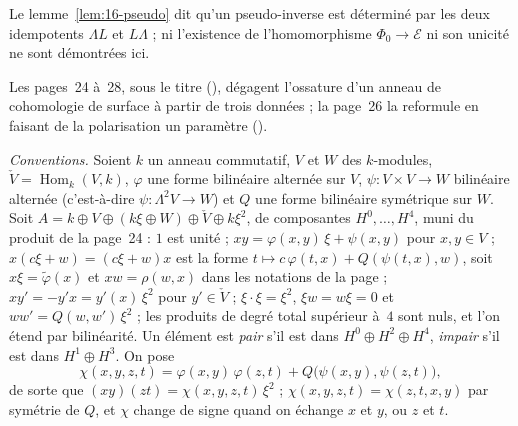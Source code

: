 \noindent Le lemme~\ref{lem:16-pseudo} dit qu'un pseudo-inverse est déterminé par les deux idempotents $\Lambda L$ et $L\Lambda$ ; ni l'existence de l'homomorphisme $\Phi_0 \to \mathcal E$ ni son unicité ne sont démontrées ici.

Les pages~24 à~28, sous le titre  (), dégagent l'ossature d'un anneau de cohomologie de surface à partir de trois données ; la page~26 la reformule en faisant de la polarisation un paramètre ().

\noindent\emph{Conventions.} Soient $k$ un anneau commutatif, $V$ et $W$ des $k$-modules, $\check V = \operatorname{Hom}_k(V, k)$, $\varphi$ une forme bilinéaire alternée sur $V$, $\psi \colon V \times V \to W$ bilinéaire alternée (c'est-à-dire $\psi \colon \Lambda^2 V \to W$) et $Q$ une forme bilinéaire symétrique sur $W$. Soit $A = k \oplus V \oplus (k\xi \oplus W) \oplus \check V \oplus k\xi^2$, de composantes $H^0, \dots, H^4$, muni du produit de la page~24 : $1$ est unité ; $xy = \varphi(x,y)\,\xi + \psi(x,y)$ pour $x, y \in V$ ; $x(c\xi + w) = (c\xi + w)x$ est la forme $t \mapsto c\,\varphi(t,x) + Q(\psi(t,x), w)$, soit $x\xi = \tilde\varphi(x)$ et $xw = \rho(w,x)$ dans les notations de la page ; $xy' = -y'x = y'(x)\,\xi^2$ pour $y' \in \check V$ ; $\xi\cdot\xi = \xi^2$, $\xi w = w\xi = 0$ et $ww' = Q(w,w')\,\xi^2$ ; les produits de degré total supérieur à~$4$ sont nuls, et l'on étend par bilinéarité. Un élément est \emph{pair} s'il est dans $H^0 \oplus H^2 \oplus H^4$, \emph{impair} s'il est dans $H^1 \oplus H^3$. On pose
\[
\chi(x,y,z,t) = \varphi(x,y)\,\varphi(z,t) + Q\bigl(\psi(x,y), \psi(z,t)\bigr),
\]
de sorte que $(xy)(zt) = \chi(x,y,z,t)\,\xi^2$ ; $\chi(x,y,z,t) = \chi(z,t,x,y)$ par symétrie de $Q$, et $\chi$ change de signe quand on échange $x$ et $y$, ou $z$ et $t$.

